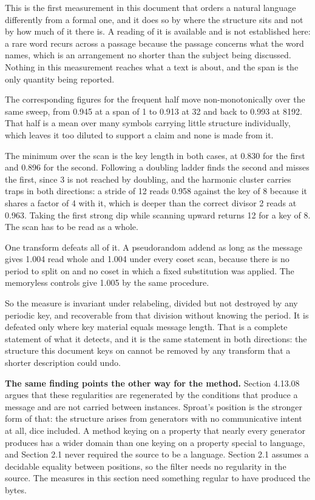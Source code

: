 This is the first measurement in this document that orders a natural language differently from a formal one, and it does so by where the structure sits and not by how much of it there is. A reading of it is available and is not established here: a rare word recurs across a passage because the passage concerns what the word names, which is an arrangement no shorter than the subject being discussed. Nothing in this measurement reaches what a text is about, and the span is the only quantity being reported.

The corresponding figures for the frequent half move non-monotonically over the same sweep, from 0.945 at a span of 1 to 0.913 at 32 and back to 0.993 at 8192. That half is a mean over many symbols carrying little structure individually, which leaves it too diluted to support a claim and none is made from it.

The minimum over the scan is the key length in both cases, at 0.830 for the first and 0.896 for the second. Following a doubling ladder finds the second and misses the first, since 3 is not reached by doubling, and the harmonic cluster carries traps in both directions: a stride of 12 reads 0.958 against the key of 8 because it shares a factor of 4 with it, which is deeper than the correct divisor 2 reads at 0.963. Taking the first strong dip while scanning upward returns 12 for a key of 8. The scan has to be read as a whole.

One transform defeats all of it. A pseudorandom addend as long as the message gives 1.004 read whole and 1.004 under every coset scan, because there is no period to split on and no coset in which a fixed substitution was applied. The memoryless controls give 1.005 by the same procedure.

So the measure is invariant under relabeling, divided but not destroyed by any periodic key, and recoverable from that division without knowing the period. It is defeated only where key material equals message length. That is a complete statement of what it detects, and it is the same statement in both directions: the structure this document keys on cannot be removed by any transform that a shorter description could undo.

\noindent\textbf{The same finding points the other way for the method.} Section 4.13.08 argues that these regularities are regenerated by the conditions that produce a message and are not carried between instances. Sproat's position is the stronger form of that: the structure arises from generators with no communicative intent at all, dice included. A method keying on a property that nearly every generator produces has a wider domain than one keying on a property special to language, and Section 2.1 never required the source to be a language. Section 2.1 assumes a decidable equality between positions, so the filter needs no regularity in the source. The measures in this section need something regular to have produced the bytes.

